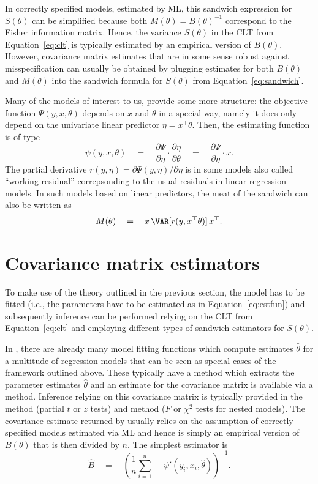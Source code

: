 \documentclass{Z}
\begin{document}
In correctly specified models, estimated by ML, this sandwich expression for
$S(\theta)$ can be simplified because both $M(\theta) = B(\theta)^{-1}$ correspond
to the Fisher information matrix. Hence, the variance $S(\theta)$ in the CLT from Equation~\ref{eq:clt}
is typically estimated by an empirical version of $B(\theta)$.
However, covariance matrix estimates that
are in some sense robust against misspecification can usually be obtained by 
plugging estimates for both $B(\theta)$ and $M(\theta)$ into the 
sandwich formula for $S(\theta)$ from Equation~\ref{eq:sandwich}.

Many of the models of interest to us, provide some more structure: the objective function
$\Psi(y, x, \theta)$ depends on $x$ and $\theta$ in a special way, namely it does only
depend on the univariate linear predictor $\eta = x^\top \theta$. Then, the estimating function is of type
\[
  \psi(y, x, \theta)
    \quad = \quad \frac{\partial \Psi}{\partial \eta} \cdot \frac{\partial \eta}{\partial \theta}
    \quad = \quad \frac{\partial \Psi}{\partial \eta} \cdot x.
\]
The partial derivative $r(y, \eta) = \partial \Psi(y, \eta) / \partial \eta$ is in some models
also called ``working residual'' correpsonding to the usual residuals in linear regression models.
In such models based on linear predictors, the meat of the sandwich can also be written as
\begin{equation} \label{eq:meatHC}
  M(\theta) \quad = \quad x \, \VAR[ r(y, x^\top \theta) ] \, x^\top.
\end{equation}



\section{Covariance matrix estimators}

To make use of the theory outlined in the previous section, the model has to be fitted
(i.e., the parameters have to be estimated as in Equation~\ref{eq:estfun}) and subsequently
inference can be performed relying on the CLT from Equation~\ref{eq:clt} and employing different
types of sandwich estimators for $S(\theta)$.

In , there are already many model fitting functions which compute estimates $\hat \theta$
for a multitude of regression models that can be seen as special cases of the framework
outlined above. These typically have a  method which extracts the parameter 
estimates $\hat \theta$ and an estimate for the covariance matrix is available via a
 method. Inference relying on this covariance matrix is typically provided
in the  method (partial $t$ or $z$ tests) and  method
($F$ or $\chi^2$ tests for nested models). The covariance estimate returned by 
usually relies on the assumption of correctly specified models estimated via ML and hence
is simply an empirical version of $B(\theta)$ that is then divided by $n$. The simplest
estimator is
\begin{equation} \label{eq:Bhat}
  \hat B \quad = \quad \left( \frac{1}{n} \sum_{i = 1}^n - \psi'(y_i, x_i, \hat \theta) \right)^{-1}.
\end{equation}
\end{document}
